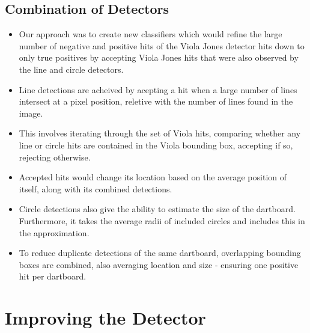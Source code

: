 \documentclass[a4paper]{article}
\begin{document}
\subsection*{Combination of Detectors}
\begin{figure}[H]
  \centering
\end{figure}

\begin{itemize}
    \item Our approach was to create new classifiers which would refine the
      large number of negative and positive hits of the Viola Jones detector
      hits down to only true positives by accepting Viola Jones hits that were
      also observed by the line and circle detectors.
    \item Line detections are acheived by acepting a hit when a large number of
      lines intersect at a pixel position, reletive with the number of lines
      found in the image.
    \item This involves iterating through the set of Viola hits, comparing
      whether any line or circle hits are contained in the Viola bounding box,
      accepting if so, rejecting otherwise.
    \item Accepted hits would change its location based on the average position of itself, along with its combined detections.
    \item Circle detections also give the ability to estimate the size of the
      dartboard. Furthermore, it takes the average radii of included circles
      and includes this in the approximation.
    \item To reduce duplicate detections of the same dartboard, overlapping
      bounding boxes are combined, also averaging location and size - ensuring
      one positive hit per dartboard.
\end{itemize}



\section*{Improving the Detector}
\end{document}
